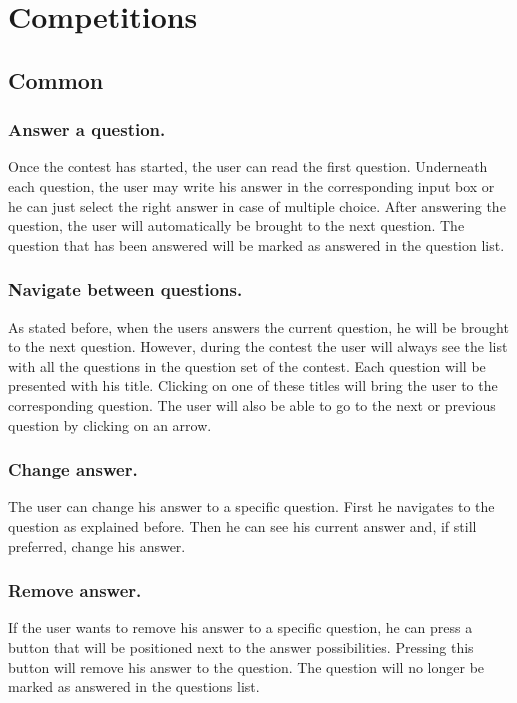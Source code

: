 \section{Competitions}

\subsection{Common}

\subsubsection{Answer a question.} 
Once the contest has started, the user can read the first question. Underneath each question, the user may write his answer in the corresponding input box or he can just select the right answer in case of multiple choice. After answering the question, the user will automatically be brought to the next question. The question that has been answered will be marked as answered in the question list.

\subsubsection{Navigate between questions.} 
As stated before, when the users answers the current question, he will be brought to the next question. However, during the contest the user will always see the list with all the questions in the question set of the contest. Each question will be presented with his title. Clicking on one of these titles will bring the user to the corresponding question. The user will also be able to go to the next or previous question by clicking on an arrow. 

\subsubsection{Change answer.} 
The user can change his answer to a specific question. First he navigates to the question as explained before. Then he can see his current answer and, if still preferred, change his answer. 

\subsubsection{Remove answer.} 
If the user wants to remove his answer to a specific question, he can press a button that will be positioned next to the answer possibilities. Pressing this button will remove his answer to the question. The question will no longer be marked as answered in the questions list.

